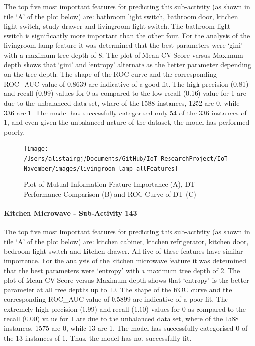 \documentclass[11pt,]{article}
\let\oldparagraph\paragraph
\renewcommand{\paragraph}[1]{\oldparagraph{#1}\mbox{}}
\begin{document}
The top five most important features for predicting this sub-activity
(as shown in tile `A' of the plot below) are: bathroom light switch,
bathroom door, kitchen light switch, study drawer and livingroom light
switch. The bathroom light switch is significantly more important than
the other four. For the analysis of the livingroom lamp feature it was
determined that the best parameters were `gini' with a maximum tree
depth of 8. The plot of Mean CV Score versus Maximum depth shows that
`gini' and `entropy' alternate as the better parameter depending on the
tree depth. The shape of the ROC curve and the corresponding ROC\_AUC
value of 0.8639 are indicative of a good fit. The high precision (0.81)
and recall (0.99) values for 0 as compared to the low recall (0.16)
value for 1 are due to the unbalanced data set, where of the 1588
instances, 1252 are 0, while 336 are 1. The model has successfully
categorised only 54 of the 336 instances of 1, and even given the
unbalanced nature of the dataset, the model has performed poorly.

\begin{figure}[H]

{\centering \texttt{[image: /Users/alistairgj/Documents/GitHub/IoT\_ResearchProject/IoT\_November/images/livingroom\_lamp\_allFeatures]} 

}

\caption{Plot of Mutual Information Feature Importance (A), DT Performance Comparison (B) and ROC Curve of DT (C)}\label{fig:unnamed-chunk-20}
\end{figure}

\hypertarget{kitchen-microwave---sub-activity-143-1}{%
\paragraph{Kitchen Microwave - Sub-Activity
143}\label{kitchen-microwave---sub-activity-143-1}}

The top five most important features for predicting this sub-activity
(as shown in tile `A' of the plot below) are: kitchen cabinet, kitchen
refrigerator, kitchen door, bedroom light switch and kitchen drawer. All
five of these features have similar importance. For the analysis of the
kitchen microwave feature it was determined that the best parameters
were `entropy' with a maximum tree depth of 2. The plot of Mean CV Score
versus Maximum depth shows that `entropy' is the better parameter at all
tree depths up to 10. The shape of the ROC curve and the corresponding
ROC\_AUC value of 0.5899 are indicative of a poor fit. The extremely
high precision (0.99) and recall (1.00) values for 0 as compared to the
recall (0.00) value for 1 are due to the unbalanced data set, where of
the 1588 instances, 1575 are 0, while 13 are 1. The model has
successfully categorised 0 of the 13 instances of 1. Thus, the model has
not successfully fit.
\end{document}
